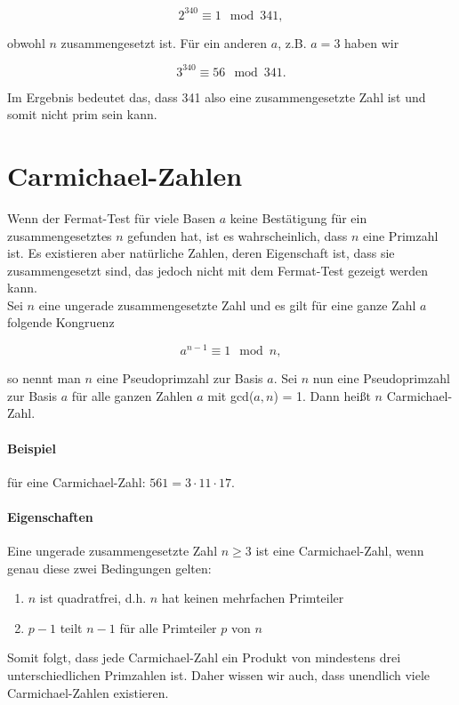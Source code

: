 $$2^{340} \equiv 1 \mod 341,$$

obwohl $n$ zusammengesetzt ist. Für ein anderen $a$, z.B. $a = 3$ haben wir 

$$3^{340} \equiv 56 \mod 341.$$

Im Ergebnis bedeutet das, dass 341 also eine zusammengesetzte Zahl ist und somit nicht prim sein kann.

\section{Carmichael-Zahlen}

Wenn der Fermat-Test für viele Basen $a$ keine Bestätigung für ein zusammengesetztes $n$
gefunden hat, ist es wahrscheinlich, dass $n$ eine Primzahl ist.
Es existieren aber natürliche Zahlen, deren Eigenschaft ist, dass sie zusammengesetzt sind,
das jedoch nicht mit dem Fermat-Test gezeigt werden kann. \\

Sei $n$ eine ungerade zusammengesetzte Zahl und es gilt für eine ganze Zahl $a$ folgende
Kongruenz

$$a^{n-1} \equiv 1 \mod n,$$

so nennt man $n$ eine Pseudoprimzahl zur Basis $a$. Sei $n$ nun eine Pseudoprimzahl zur Basis $a$ für alle ganzen Zahlen $a$ mit gcd($a,n$) = 1. Dann
heißt $n$ Carmichael-Zahl. 

\paragraph{Beispiel} für eine Carmichael-Zahl: $561 = 3 \cdot 11 \cdot 17$.

\paragraph{Eigenschaften} Eine ungerade zusammengesetzte Zahl $n \geq 3$ ist eine Carmichael-Zahl, wenn genau
diese zwei Bedingungen gelten:
\begin{enumerate}
    \item $n$ ist quadratfrei, d.h. $n$ hat keinen mehrfachen Primteiler
    \item $p - 1$ teilt $n - 1$ für alle Primteiler $p$ von $n$
\end{enumerate}

Somit folgt, dass jede Carmichael-Zahl ein Produkt von mindestens drei unterschiedlichen
Primzahlen ist. Daher wissen wir auch, dass unendlich viele Carmichael-Zahlen existieren.

